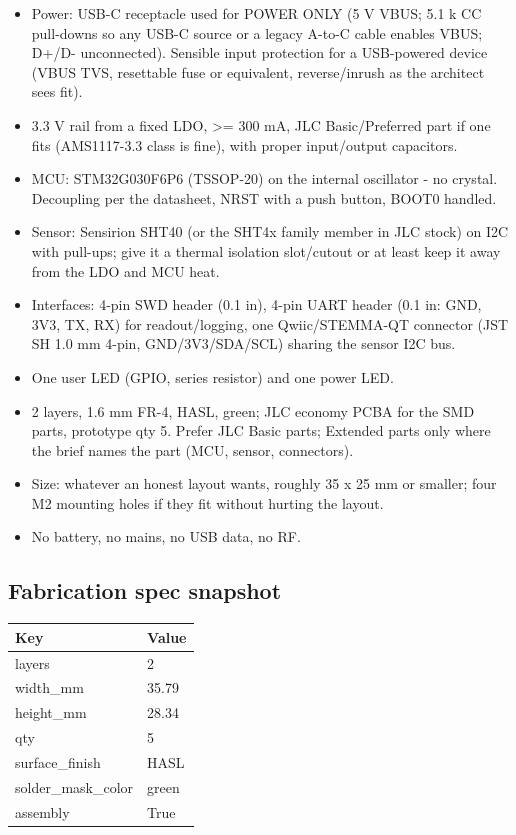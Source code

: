 \documentclass[11pt,a4paper]{article}
\begin{document}
\begin{itemize}
\item Power: USB-C receptacle used for POWER ONLY (5 V VBUS; 5.1 k CC pull-downs so
any USB-C source or a legacy A-to-C cable enables VBUS; D+/D- unconnected).
Sensible input protection for a USB-powered device (VBUS TVS, resettable
fuse or equivalent, reverse/inrush as the architect sees fit).
\item 3.3 V rail from a fixed LDO, \textgreater{}= 300 mA, JLC Basic/Preferred part if one fits
(AMS1117-3.3 class is fine), with proper input/output capacitors.
\item MCU: STM32G030F6P6 (TSSOP-20) on the internal oscillator - no crystal.
Decoupling per the datasheet, NRST with a push button, BOOT0 handled.
\item Sensor: Sensirion SHT40 (or the SHT4x family member in JLC stock) on I2C with
pull-ups; give it a thermal isolation slot/cutout or at least keep it away
from the LDO and MCU heat.
\item Interfaces: 4-pin SWD header (0.1 in), 4-pin UART header (0.1 in: GND, 3V3,
TX, RX) for readout/logging, one Qwiic/STEMMA-QT connector (JST SH 1.0 mm
4-pin, GND/3V3/SDA/SCL) sharing the sensor I2C bus.
\item One user LED (GPIO, series resistor) and one power LED.
\item 2 layers, 1.6 mm FR-4, HASL, green; JLC economy PCBA for the SMD parts,
prototype qty 5. Prefer JLC Basic parts; Extended parts only where the brief
names the part (MCU, sensor, connectors).
\item Size: whatever an honest layout wants, roughly 35 x 25 mm or smaller; four
M2 mounting holes if they fit without hurting the layout.
\item No battery, no mains, no USB data, no RF.
\end{itemize}
\subsection*{Fabrication spec snapshot}
{\small
\begin{longtable}{ll}
\toprule
\textbf{Key} & \textbf{Value} \\
\midrule
\endhead
layers & 2 \\
width\_mm & 35.79 \\
height\_mm & 28.34 \\
qty & 5 \\
surface\_finish & HASL \\
solder\_mask\_color & green \\
assembly & True \\
\bottomrule
\end{longtable}
}
\end{document}
